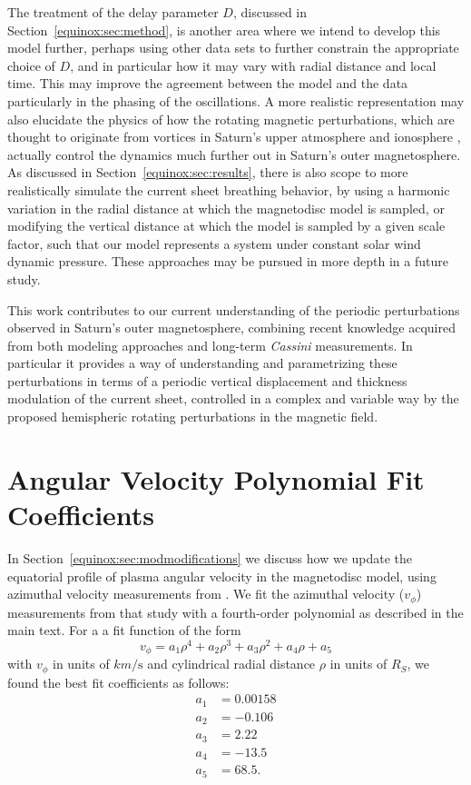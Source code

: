 The treatment of the delay parameter $D$, discussed in Section~\ref{equinox:sec:method}, is another area where we intend to develop this model further, perhaps using other data sets to further constrain the appropriate choice of $D$, and in particular how it may vary with radial distance and local time. This may improve the agreement between the model and the data particularly in the phasing of the oscillations. A more realistic representation may also elucidate the physics of how the rotating magnetic perturbations, which are thought to originate from vortices in Saturn's upper atmosphere and ionosphere \citep[e.g.][]{jiaandkivelson2012}, actually control the dynamics much further out in Saturn's outer magnetosphere. As discussed in Section~\ref{equinox:sec:results}, there is also scope to more realistically simulate the current sheet breathing behavior, by using a harmonic variation in the radial distance at which the magnetodisc model is sampled, or modifying the vertical distance at which the model is sampled by a given scale factor, such that our model represents a system under constant solar wind dynamic pressure. These approaches may be pursued in more depth in a future study.

This work contributes to our current understanding of the periodic perturbations observed in Saturn's outer magnetosphere, combining recent knowledge acquired from both modeling approaches and long-term \textit{Cassini} measurements. In particular it provides a way of understanding and parametrizing these perturbations in terms of a periodic vertical displacement and thickness modulation of the current sheet, controlled in a complex and variable way by the proposed hemispheric rotating perturbations in the magnetic field.

\section{Angular Velocity Polynomial Fit Coefficients}
In Section~\ref{equinox:sec:modmodifications} we discuss how we update the equatorial profile of plasma angular velocity in the magnetodisc model, using azimuthal velocity measurements from \citet{wilson2017}. We fit the azimuthal velocity ($v_\phi$) measurements from that study with a fourth-order polynomial as described in the main text. For a a fit function of the form
\begin{equation} \label{equinox:fourthorderpoly}
v_\phi = a_1\rho^4 + a_2\rho^3 + a_3\rho^2 + a_4\rho +a_5
\end{equation}
with $v_\phi$ in units of $\si{km\per\second}$ and cylindrical radial distance $\rho$ in units of $\si{R_S}$, we found the best fit coefficients as follows:
\begin{align}
a_1 &=  0.00158 \nonumber \\
a_2 &=  -0.106 \nonumber \\
a_3 &=  2.22 \nonumber \\
a_4 &= -13.5 \nonumber \\
a_5 &=  68.5.
\end{align}
      
